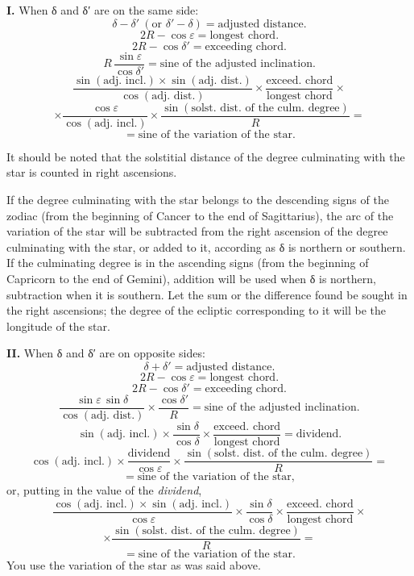 \documentclass[11pt]{article}
\newcommand{\Pg}[1]{\marginpar{\footnotesize\color{gray}#1}}
\begin{document}
\par \textbf{I.} When {\greekfont δ} and {\greekfont δ}′ are on the same side: \[ \delta - \delta'\ (\text{or } \delta' - \delta) = \text{adjusted distance}. \] \[ 2R - \cos\varepsilon = \text{longest chord}. \] \[ 2R - \cos\delta' = \text{exceeding chord}. \] \[ R\,\frac{\sin\varepsilon}{\cos\delta'} = \text{sine of the adjusted inclination}. \] \[ \frac{\sin(\text{adj. incl.}) \times \sin(\text{adj. dist.})}{\cos(\text{adj. dist.})} \times \frac{\text{exceed. chord}}{\text{longest chord}} \times \] \[ \times \frac{\cos\varepsilon}{\cos(\text{adj. incl.})} \times \frac{\sin(\text{solst. dist. of the culm. degree})}{R} = \] \[ = \text{sine of the variation of the star}. \]\par
\par It should be noted that the solstitial distance of the degree culminating with the star is counted in right ascensions.\par
\par If the degree culminating with the star belongs to the descending signs of the zodiac (from the beginning of Cancer to the end of Sagittarius), the arc of the variation of the star will be subtracted from the right ascension of the degree culminating with the star, or added to it, according as {\greekfont δ} is northern or southern. If the culminating degree is in the ascending signs (from the beginning of Capricorn to the end of Gemini), addition will be used when {\greekfont δ} is northern, subtraction when it is southern. Let the sum or the difference found be sought in the right ascensions; the degree of the ecliptic corresponding to it will be the longitude of the star.\par
\par \Pg{I 198}\textbf{II.} When {\greekfont δ} and {\greekfont δ}′ are on opposite sides: \[ \delta + \delta' = \text{adjusted distance}. \] \[ 2R - \cos\varepsilon = \text{longest chord}. \] \[ 2R - \cos\delta' = \text{exceeding chord}. \] \[ \frac{\sin\varepsilon\,\sin\delta}{\cos(\text{adj. dist.})} \times \frac{\cos\delta'}{R} = \text{sine of the adjusted inclination}. \] \[ \sin(\text{adj. incl.}) \times \frac{\sin\delta}{\cos\delta} \times \frac{\text{exceed. chord}}{\text{longest chord}} = \text{dividend}. \] \[ \cos(\text{adj. incl.}) \times \frac{\text{dividend}}{\cos\varepsilon} \times \frac{\sin(\text{solst. dist. of the culm. degree})}{R} = \] \[ = \text{sine of the variation of the star}, \] or, putting in the value of the \emph{dividend}, \[ \frac{\cos(\text{adj. incl.}) \times \sin(\text{adj. incl.})}{\cos\varepsilon} \times \frac{\sin\delta}{\cos\delta} \times \frac{\text{exceed. chord}}{\text{longest chord}} \times \] \[ \times \frac{\sin(\text{solst. dist. of the culm. degree})}{R} = \] \[ = \text{sine of the variation of the star}. \] You use the variation of the star as was said above.\par
\end{document}
